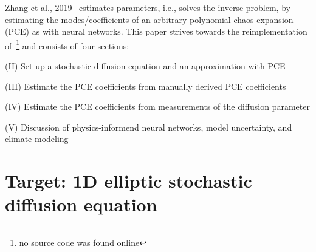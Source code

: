 \documentclass[letterpaper, 10 pt, conference, twocolumn]{ieeeconf}  %
\begin{document}
Zhang et al., 2019~\cite{Zhang_2019} estimates parameters, i.e., solves the inverse problem, by estimating the modes/coefficients of an arbitrary polynomial chaos expansion (PCE) as with neural networks. This paper strives towards the reimplementation of~\cite{Zhang_2019}\footnote{no source code was found online} and consists of four sections: 
\bit
  \item (II) Set up a stochastic diffusion equation and an approximation with PCE
  \item (III) Estimate the PCE coefficients from manually derived PCE coefficients
  \item (IV) Estimate the PCE coefficients from measurements of the diffusion parameter
  \item (V) Discussion of physics-informend neural networks, model uncertainty, and climate modeling

\ei

\section{Target: 1D elliptic stochastic diffusion equation}\label{sec:1}
\end{document}
